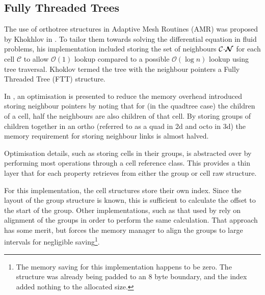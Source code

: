 \documentclass[twoside]{IIBproject}
\newcommand{\vect} [1] {\bm{#1}}
\newcommand{\acc}{{\mkern 0.5mu\cdot\mkern 0.5mu}}
\newcommand{\bigO} [1]{\mathcal{O}(#1)}
\numberwithin{figure}{section}
\begin{document}



    \subsection{Fully Threaded Trees} %
        \label{sec:ftt}

        The use of orthotree structures in Adaptive Mesh Routines (AMR) was proposed by Khokhlov in \cite{Khokhlov98}. To tailor them towards solving the differential equation in fluid problems, his implementation included storing the set of neighbours $\mathcal{C}\acc\vect{\mathcal{N}}$ for each cell $\mathcal{C}$ to allow $\bigO{1}$ lookup compared to a possible $\bigO{\log n}$ lookup using tree traversal. Khoklov termed the tree with the neighbour pointers a Fully Threaded Tree (FTT) structure.

        In \cite{Khokhlov98}, an optimisation is presented to reduce the memory overhead introduced storing neighbour pointers by noting that for (in the quadtree case) the children of a cell, half the neighbours are also children of that cell. By storing groups of children together in an ortho (referred to as a quad in 2d and octo in 3d) the memory requirement for storing neighbour links is almost halved.

        Optimisation details, such as storing cells in their groups, is abstracted over by performing most operations through a cell reference class. This provides a thin layer that for each property retrieves from either the group or cell raw structure. 

        For this implementation, the cell structures store their own index. Since the layout of the group structure is known, this is sufficient to calculate the offset to the start of the group. Other implementations, such as that used by \cite{Yung2010} rely on alignment of the groups in order to perform the same calculation. That approach has some merit, but forces the memory manager to align the groups to large intervals for negligible saving\footnote{The memory saving for this implementation happens to be zero. The structure was already being padded to an 8 byte boundary, and the index added nothing to the allocated size. }.



\end{document}
